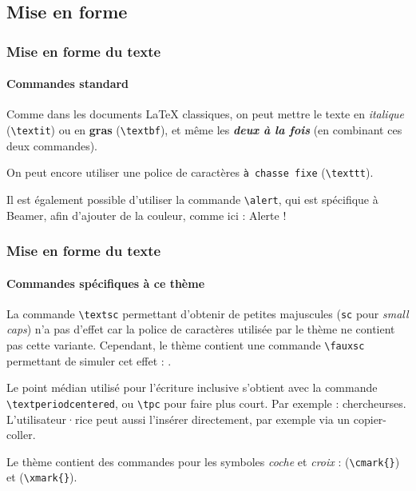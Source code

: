 \documentclass[10pt,    %
    french,             %
    xcolor=table,       %
    envcountsect,       %
    aspectratio=43      %
]{beamer}
\begin{document}
\subsection{Mise en forme}
\begin{frame}
    \frametitle{Mise en forme du texte}
    \framesubtitle{Commandes standard}
    
    Comme dans les documents \LaTeX{} classiques, on peut mettre le texte en \textit{italique} (\texttt{\textbackslash{}textit}) ou en \textbf{gras} (\texttt{\textbackslash{}textbf}), et même les \textit{\textbf{deux à la fois}} (en combinant ces deux commandes). 
    
    \vspace{0.25cm}
    On peut encore utiliser une police de caractères \texttt{à chasse fixe} (\texttt{\textbackslash{}texttt}).
    
    \vspace{0.25cm}
    Il est également possible d'utiliser la commande \texttt{\textbackslash{}alert}, qui est spécifique à Beamer, afin d'ajouter de la couleur, comme ici : \alert{Alerte !}
    
\end{frame}
    
\begin{frame}
    \frametitle{Mise en forme du texte}
    \framesubtitle{Commandes spécifiques à ce thème}
    
    La commande \texttt{\textbackslash{}textsc} permettant d'obtenir de petites majuscules (\texttt{sc} pour \textit{small caps}) n'a pas d'effet car la police de caractères utilisée par le thème ne contient pas cette variante. Cependant, le thème contient une commande \texttt{\textbackslash{}fauxsc} permettant de simuler cet effet : .
    
    \vspace{0.25cm}
    Le point médian utilisé pour l'écriture inclusive s'obtient avec la commande \texttt{\textbackslash{}textperiodcentered}, ou \texttt{\textbackslash{}tpc} pour faire plus court. Par exemple : chercheur\textperiodcentered{}se\tpc{}s. L'utilisateur·rice peut aussi l'insérer directement, par exemple via un copier-coller.

    \vspace{0.25cm}
    Le thème contient des commandes pour les symboles \textit{coche} et \textit{croix} : \cmark{} (\texttt{\textbackslash{}cmark\{\}}) et \xmark{} (\texttt{\textbackslash{}xmark\{\}}).
\end{frame}
    
\end{document}
